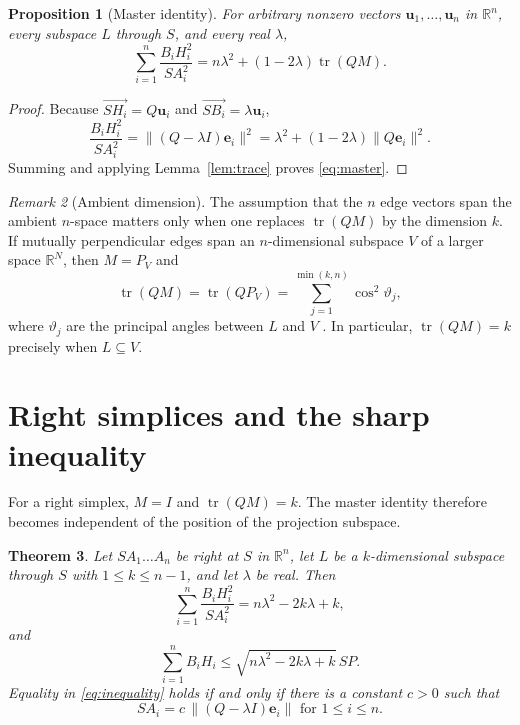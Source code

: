 \documentclass[11pt]{article}
\newtheorem{theorem}{Theorem}[section]
\newtheorem{proposition}[theorem]{Proposition}
\theoremstyle{definition}
\theoremstyle{remark}
\newtheorem{remark}[theorem]{Remark}
\DeclareMathOperator{\tr}{tr}
\newcommand{\R}{\mathbb{R}}
\newcommand{\bu}{\mathbf u}
\newcommand{\be}{\mathbf e}
\newcommand{\norm}[1]{\lVert #1 \rVert}
\begin{document}
\begin{proposition}[Master identity]\label{prop:master}
For arbitrary nonzero vectors $\bu_1,\ldots,\bu_n$ in $\R^n$, every subspace $L$ through
$S$, and every real $\lambda$,
\begin{equation}\label{eq:master}
\sum_{i=1}^{n}\frac{B_iH_i^{2}}{SA_i^{2}}
=
n\lambda^{2}+(1-2\lambda)\tr(QM).
\end{equation}
\end{proposition}

\begin{proof}
Because $\overrightarrow{SH_i}=Q\bu_i$ and
$\overrightarrow{SB_i}=\lambda\bu_i$,
\[
\frac{B_iH_i^{2}}{SA_i^{2}}
=
\norm{(Q-\lambda I)\be_i}^{2}
=
\lambda^{2}+(1-2\lambda)\norm{Q\be_i}^{2}.
\]
Summing and applying Lemma~\ref{lem:trace} proves \eqref{eq:master}.
\end{proof}

\begin{remark}[Ambient dimension]\label{rem:ambient}
The assumption that the $n$ edge vectors span the ambient $n$-space matters only when one
replaces $\tr(QM)$ by the dimension $k$. If mutually perpendicular edges span an
$n$-dimensional subspace $V$ of a larger space $\R^N$, then $M=P_V$ and
\[
\tr(QM)=\tr(QP_V)
=
\sum_{j=1}^{\min(k,n)}\cos^2\vartheta_j,
\]
where $\vartheta_j$ are the principal angles between $L$ and $V$ \cite{BjorckGolub}. In
particular, $\tr(QM)=k$ precisely when $L\subseteq V$.
\end{remark}

\section{Right simplices and the sharp inequality}\label{sec:right}

For a right simplex, $M=I$ and $\tr(QM)=k$. The master identity therefore becomes
independent of the position of the projection subspace.

\begin{theorem}\label{thm:right}
Let $SA_1\ldots A_n$ be right at $S$ in $\R^n$, let $L$ be a $k$-dimensional subspace
through $S$ with $1\le k\le n-1$, and let $\lambda$ be real. Then
\begin{equation}\label{eq:identity}
\sum_{i=1}^{n}\frac{B_iH_i^{2}}{SA_i^{2}}
=
n\lambda^{2}-2k\lambda+k,
\end{equation}
and
\begin{equation}\label{eq:inequality}
\sum_{i=1}^{n}B_iH_i
\le
\sqrt{n\lambda^{2}-2k\lambda+k}\,SP.
\end{equation}
Equality in \eqref{eq:inequality} holds if and only if there is a constant $c>0$ such that
\begin{equation}\label{eq:equalitycase}
SA_i=c\,\norm{(Q-\lambda I)\be_i} \text{ for } 1\le i\le n.
\end{equation}
\end{theorem}
\end{document}
